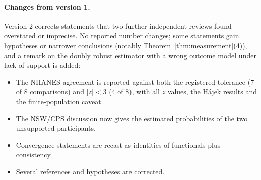 \paragraph{Changes from version 1.} Version 2 corrects statements that two further independent reviews found overstated or imprecise. No reported number changes; some statements gain hypotheses or narrower conclusions (notably Theorem~\ref{thm:measurement}(4)), and a remark on the doubly robust estimator with a wrong outcome model under lack of support is added:
\begin{itemize}
  \item The NHANES agreement is reported against both the registered tolerance (7 of 8 comparisons) and $|z|<3$ (4 of 8), with all $z$ values, the H\'ajek results and the finite-population caveat.
  \item The NSW/CPS discussion now gives the estimated probabilities of the two unsupported participants.
  \item Convergence statements are recast as identities of functionals plus consistency.
  \item Several references and hypotheses are corrected.
\end{itemize}
